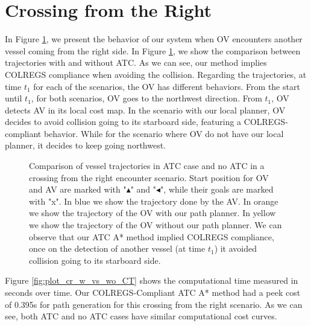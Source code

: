         
        \section{Crossing from the Right}
        
        In Figure \ref{fig:plot_cr_w_vs_wo}, we present the behavior of our system when \ac{OV} encounters another vessel coming from the right side. In Figure \ref{fig:plot_cr_w_vs_wo}, we show the comparison between trajectories with and without \ac{ATC}. As we can see, our method implies \ac{COLREGS} compliance when avoiding the collision. Regarding the trajectories, at time $t_1$ for each of the scenarios, the \ac{OV} has different behaviors. From the start until $t_1$, for both scenarios, \ac{OV} goes to the northwest direction. From $t_1$, \ac{OV} detects \ac{AV} in its local cost map. In the scenario with our local planner, \ac{OV} decides to avoid collision going to its starboard side, featuring a \ac{COLREGS}-compliant behavior. While for the scenario where \ac{OV} do not have our local planner, it decides to keep going northwest.
        
        \begin{figure}
            \centering
            
            \caption{Comparison of vessel trajectories in \ac{ATC} case and no \ac{ATC} in a crossing from the right encounter scenario. Start position for \ac{OV} and \ac{AV} are marked with "$\blacktriangle$" and "$\blacktriangleleft$", while their goals are marked with "x". In blue we show the trajectory done by the \ac{AV}. In orange we show the trajectory of the \ac{OV} with our path planner. In yellow we show the trajectory of the \ac{OV} without our path planner. We can observe that our \ac{ATC} A* method implied \ac{COLREGS} compliance, once on the detection of another vessel (at time $t_1$) it avoided collision going to its starboard side.}
            \label{fig:plot_cr_w_vs_wo}
        \end{figure}

        Figure \ref{fig:plot_cr_w_vs_wo_CT} shows the computational time measured in seconds over time. Our \ac{COLREGS}-Compliant \ac{ATC} A* method had a peek cost of 0.395s for path generation for this crossing from the right scenario. As we can see, both \ac{ATC} and no \ac{ATC} cases have similar computational cost curves.
        

